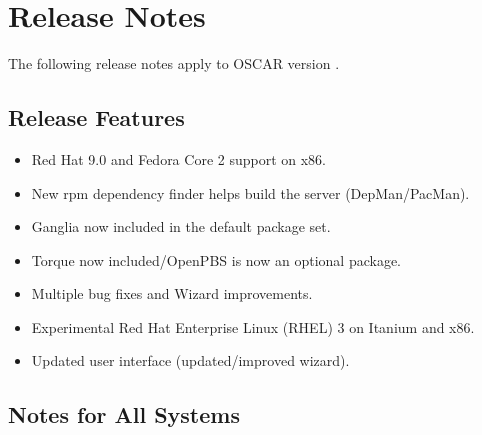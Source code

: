 %
% 
%
%

\section{Release Notes}
\label{sec:release-notes}

The following release notes apply to OSCAR version \oscarversion.
\subsection{Release Features}
\label{subsec:release-features}

\begin{itemize}

\item Red Hat 9.0 and Fedora Core 2 support on x86.
\item New rpm dependency finder helps build the server (DepMan/PacMan).
\item Ganglia now included in the default package set.
\item Torque now included/OpenPBS is now an optional package.
\item Multiple bug fixes and Wizard improvements.
\item Experimental Red Hat Enterprise Linux (RHEL) 3 on Itanium and x86.
\item Updated user interface (updated/improved wizard). 

\end{itemize}

\subsection{Notes for All Systems}
\label{subsec:release-notes}

